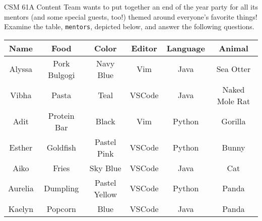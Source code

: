 CSM 61A Content Team wants to put together an end of the year party for all its mentors (and some special guests, too!) themed around everyone's favorite things! Examine the table, \texttt{mentors}, depicted below, and answer the following questions.

\begin{center}
\begin{tabular}{|c|c|c|c|c|c|}
 \hline
 \textbf{Name} & \textbf{Food} & \textbf{Color} & \textbf{Editor} & \textbf{Language} & \textbf{Animal}\\
 \hline
 Alyssa & Pork Bulgogi & Navy Blue & Vim & Java & Sea Otter\\
 \hline
 Vibha & Pasta & Teal & VSCode & Java & Naked Mole Rat\\
 \hline
 Adit & Protein Bar & Black & Vim & Python & Gorilla\\
 \hline
 Esther & Goldfish & Pastel Pink & VSCode & Python & Bunny\\
 \hline
 Aiko & Fries & Sky Blue & VSCode & Java & Cat\\
 \hline
 Aurelia & Dumpling & Pastel Yellow & VSCode & Python & Panda\\
 \hline
 Kaelyn & Popcorn & Blue & VSCode & Java & Panda\\
 \hline
\end{tabular}
\end{center}
